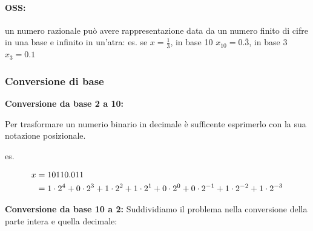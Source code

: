 \documentclass[a4paper, 11pt]{article}
\begin{document}
            \paragraph{OSS:}
            un numero razionale può avere rappresentazione data da un numero finito di cifre in una base e infinito in un'atra:
            es. se $x = \frac{1}{3}$, in base 10 $x_{10} = 0.\overline{3}$, in base 3  $x_{3} = 0.1$
            
        
        \subsubsection{Conversione di base}

            \textbf {Conversione da base 2 a 10:}

            Per trasformare un numerio binario in decimale è sufficente esprimerlo con la sua notazione posizionale.

            es. 

                \begin{align}
                    x &= 10110.011 \notag \\
                    &= 1\cdot2^4 + 0\cdot2^3 + 1\cdot2^2 + 1\cdot2^1 + 0\cdot2^0 + 0\cdot2^{-1} + 1\cdot2^{-2} + 1\cdot2^{-3} \notag
                \end{align}
        \pagebreak
            


            \textbf{Conversione da base 10 a 2:}
            Suddividiamo il problema nella conversione della parte intera e quella decimale:
\end{document}
